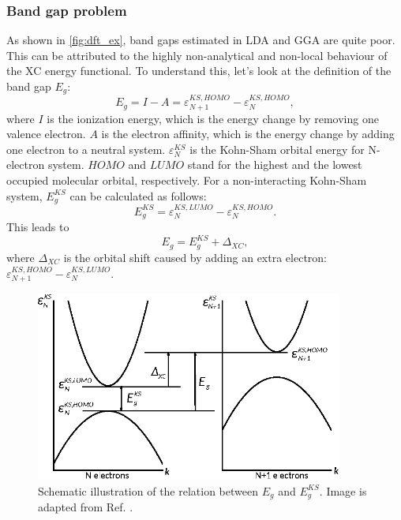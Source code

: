 \subsubsection{Band gap problem}
As shown in \autoref{fig:dft_ex}, band gaps estimated in LDA and GGA are quite poor. This can be attributed to the highly non-analytical and non-local behaviour of the XC energy functional. To understand this, let's look at the definition of the band gap $E_{g}$:
\begin{equation}
E_{g}=I-A=\varepsilon_{N+1}^{KS,HOMO}-\varepsilon_N^{KS,HOMO},
\end{equation}
where $I$ is the ionization energy, which is the energy change by removing one valence electron. $A$ is the electron affinity, which is the energy change by adding one electron to a neutral system. $\varepsilon_N^{KS}$ is the Kohn-Sham orbital energy for N-electron system. $HOMO$ and $LUMO$ stand for the highest and the lowest occupied molecular orbital, respectively. For a non-interacting Kohn-Sham system, $E_{g}^{KS}$ can be calculated as follows:
\begin{equation}
E_{g}^{KS}=\varepsilon_{N}^{KS,LUMO}-\varepsilon_{N}^{KS,HOMO}.
\end{equation}
This leads to 
\begin{equation}
E_{g}=E_{g}^{KS}+\Delta_{XC},
\end{equation}
where $\Delta_{XC}$ is the orbital shift caused by adding an extra electron: $\varepsilon_{N+1}^{KS,HOMO}-\varepsilon_{N}^{KS,LUMO}$.
\begin{figure}[htbp!] 
\centering  
\includegraphics[width=0.9\textwidth]{Eg.eps}
\caption[Schematic illustration of the relation between $E_g$ and $E^{KS}_g$]{ Schematic illustration of the relation between $E_g$ and $E^{KS}_g$. Image is adapted from Ref. \cite{fiolhais2008primer}.}  
\label{fig:dft_eg}
\end{figure} 

